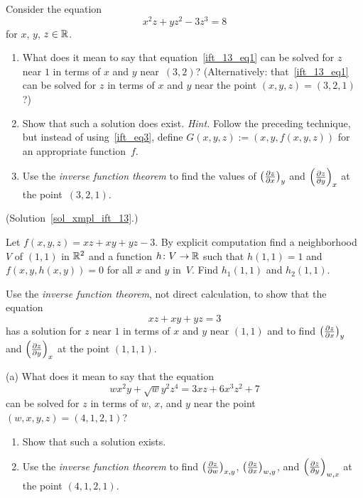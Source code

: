 \begin{exer}\label{xmpl_ift_13} Consider the equation
  \begin{equation}\label{ift_13_eq1}
        x^2z + yz^2 - 3z^3 = 8
  \end{equation}
for $x$, $y$, $z \in \mathbb{R}$.
 \begin{enumerate}
  \item[(a)] What does it mean to say that equation~\eqref{ift_13_eq1} can be solved for $z$
near $1$ in terms of $x$ and $y$ near~$(3,2)$?  (Alternatively: that~\eqref{ift_13_eq1} can be
solved for $z$ in terms of $x$ and $y$ near the point $(x,y,z) = (3,2,1)$?)
  \item[(b)] Show that such a solution does exist. \emph{Hint.} Follow the preceding technique,
but instead of using~\eqref{ift_eq3}, define $G(x,y,z) := (x,y,f(x,y,z))$ for an appropriate
function~$f$.
  \item[(c)] Use the \emph{inverse function theorem} to find the values of $\left(\frac{\partial z}{\partial x} \right)_y$
and $\left(\frac{\partial z}{\partial y} \right)_x$ at the point~$(3,2,1)$.
 \end{enumerate}
 (Solution~\ref{sol_xmpl_ift_13}.)
\end{exer}

\begin{prob}\label{ift_prob2} Let $f(x,y,z) = xz + xy + yz - 3$. By explicit computation find a
neighborhood $V$ of $(1,1)$ in $\mathbb{R}^2$ and a function $h \colon V \rightarrow \mathbb{R}$ such that $h(1,1) =
1$ and $f(x,y,h(x,y)) = 0$ for all $x$ and $y$ in~$V$.  Find $h_1(1,1)$ and $h_2(1,1)$.
\end{prob}

\begin{prob}  Use the \emph{inverse function theorem}, not direct calculation, to show that the equation
  \[ xz + xy + yz = 3 \]
has a solution for $z$ near $1$ in terms of $x$ and $y$ near $(1,1)$ and to find $\left(\frac{\partial z}{\partial x}
\right)_y$ and $\left(\frac{\partial z}{\partial y} \right)_x$ at the point $(1,1,1)$.
\end{prob}

\begin{prob}(a) What does it mean to say that the equation
  \[ wx^2y + \sqrt wy^2z^4 = 3xz + 6x^3z^2 + 7 \]
can be solved for $z$ in terms of $w$, $x$, and $y$ near the point $(w,x,y,z) = (4,1,2,1)$?
 \begin{enumerate}
  \item[(b)] Show that such a solution exists.
  \item[(c)] Use the \emph{inverse function theorem} to find $\left(\frac{\partial z}{\partial w} \right)_{x,y}$,
$\left(\frac{\partial z}{\partial x} \right)_{w,y}$, and $\left(\frac{\partial z}{\partial y} \right)_{w,x}$ at the point $(4,1,2,1)$.
 \end{enumerate}
\end{prob}

